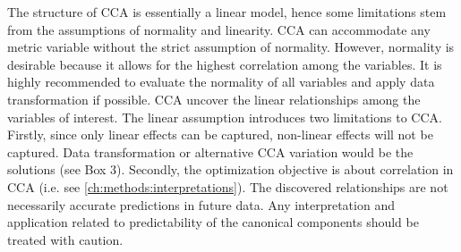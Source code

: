 The structure of CCA is essentially a linear model, hence some limitations stem from the assumptions of normality and linearity. CCA can accommodate any metric variable without the strict assumption of normality. However, normality is desirable because it allows for the highest correlation among the variables. It is highly recommended to evaluate the normality of all variables and apply data transformation if possible. CCA uncover the linear relationships among the variables of interest. The linear assumption introduces two limitations to CCA. Firstly, since only linear effects can be captured, non-linear effects will not be captured. Data transformation or alternative CCA variation would be the solutions (see Box 3). Secondly, the optimization objective is about correlation in CCA (i.e. see \cref{ch:methods:interpretations}). The discovered relationships are not necessarily accurate predictions in future data. Any interpretation and application related to predictability of the canonical components should be treated with caution. 
\newpage
